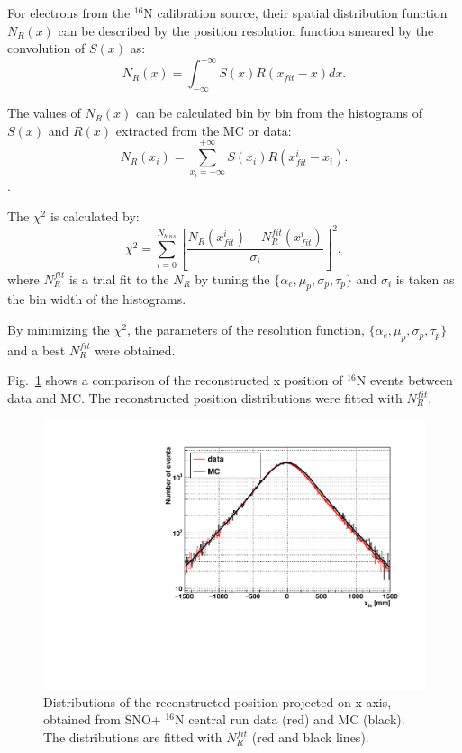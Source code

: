 For electrons from the $^{16}$N calibration source, their spatial distribution function $N_{R}(x)$ can be described by the position resolution function smeared by the convolution of $S(x)$ as\cite{boulay2004direct}:
\[
N_{R}(x)=\int^{+\infty}_{-\infty} S(x)R(x_{fit}-x)dx.
\]

The values of $N_{R}(x)$ can be calculated bin by bin from the histograms of $S(x)$ and $R(x)$ extracted from the MC or data: 
\[
N_R(x_i)=\sum_{x_i=-\infty}^{+\infty}S(x_i)R(x_{fit}^i-x_i).
\].

The $\chi^2$ is calculated by:
\[
\chi^2=\sum^{N_{bins}}_{i=0}[\frac{N_R(x_{fit}^i)-N_R^{fit}(x_{fit}^i)}{\sigma_i}]^2,
\]
where $N_R^{fit}$ is a trial fit to the $N_R$ by tuning the $\{\alpha_e,\mu_p,\sigma_p,\tau_p\}$ and $\sigma_i$ is taken as the bin width of the histograms.

By minimizing the $\chi^2$, the parameters of the resolution function, $\{\alpha_e,\mu_p,\sigma_p,\tau_p\}$ and a best $N_R^{fit}$ were obtained.

Fig.~\ref{fig:posresol} shows a comparison of the reconstructed x position of {$^{16}$}N events between data and MC. The reconstructed position distributions were fitted with $N_R^{fit}$.

\begin{figure}
	\centering
	\includegraphics[width=140mm]{posResol.pdf}
	\caption{Distributions of the reconstructed position projected on x axis, obtained from SNO+ {$^{16}$}N central run data (red) and MC (black). The distributions are fitted with $N_R^{fit}$ (red and black lines).}
	\label{fig:posresol}
\end{figure}

